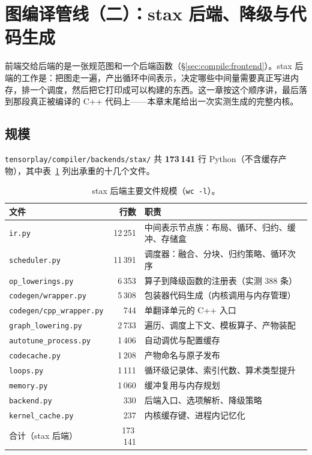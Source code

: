 \section{图编译管线（二）：stax 后端、降级与代码生成}
\label{sec:compile:backend}

前端交给后端的是一张规范图和一个后端函数（\S\ref{sec:compile:frontend}）。stax 后端的工作是：把图走一遍，产出循环中间表示，决定哪些中间量需要真正写进内存，排一个调度，然后把它打印成可以构建的东西。这一章按这个顺序讲，最后落到那段真正被编译的 C++ 代码上——本章末尾给出一次实测生成的完整内核。

\subsection{规模}

\texttt{tensorplay/compiler/backends/stax/} 共 \textbf{173\,141} 行 Python（不含缓存产物），其中表~\ref{tab:be:files} 列出承重的十几个文件。

\begin{table}[H]
\centering
\caption{stax 后端主要文件规模（\texttt{wc -l}）。}
\label{tab:be:files}
\small
\begin{tabular}{lrl}
\toprule
文件 & 行数 & 职责 \\
\midrule
\texttt{ir.py} & 12\,251 & 中间表示节点族：布局、循环、归约、缓冲、存储盒 \\
\texttt{scheduler.py} & 11\,391 & 调度器：融合、分块、归约策略、循环次序 \\
\texttt{op\_lowerings.py} & 6\,353 & 算子到降级函数的注册表（实测 388 条） \\
\texttt{codegen/wrapper.py} & 5\,308 & 包装器代码生成（内核调用与内存管理） \\
\texttt{codegen/cpp\_wrapper.py} & 744 & 单翻译单元的 C++ 入口 \\
\texttt{graph\_lowering.py} & 2\,733 & 遍历、调度上下文、模板算子、产物装配 \\
\texttt{autotune\_process.py} & 1\,406 & 自动调优与配置缓存 \\
\texttt{codecache.py} & 1\,208 & 产物命名与原子发布 \\
\texttt{loops.py} & 1\,111 & 循环级记录体、索引代数、算术类型提升 \\
\texttt{memory.py} & 1\,060 & 缓冲复用与内存规划 \\
\texttt{backend.py} & 330 & 后端入口、选项解析、降级策略 \\
\texttt{kernel\_cache.py} & 237 & 内核缓存键、进程内记忆化 \\
\midrule
合计（stax 后端） & 173\,141 & \\
\bottomrule
\end{tabular}
\end{table}


